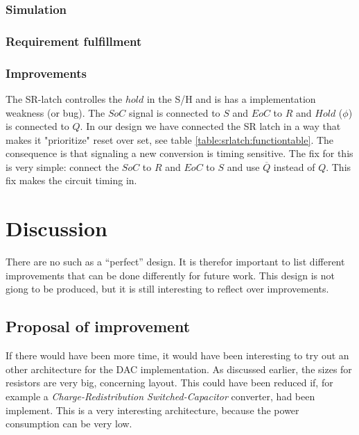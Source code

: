\documentclass[english, 12pt, a4paper]{ifimaster}
\begin{document}
% 


\subsection{Simulation}


\subsection{Requirement fulfillment}

\subsection{Improvements}
The SR-latch controlles the \(hold\) in the S/H and is has a implementation weakness (or bug). The \(SoC\) signal is connected to \(S\) and \(EoC\) to  \(R\) and \(Hold\) (\(\phi\)) is connected to \(Q\). 
In our design we have connected the SR latch in a way that makes it "prioritize" reset over set, see table \ref{table:srlatch:functiontable}.
The consequence is that signaling a new conversion is timing sensitive.
The fix for this is very simple: connect the \(SoC\) to \(R\) and \(EoC\) to \(S\) and use \(\overline{Q}\) instead of \(Q\). This fix makes the circuit timing in.


\chapter{Discussion}
There are no such as a ``perfect'' design. It is therefor important to list different improvements that
can be done differently for future work. This design is not giong to be produced, but it is still 
interesting to reflect over improvements. 

\section{Proposal of improvement}
If there would have been more time, it would have been interesting to try out an other architecture
for the DAC implementation. As discussed earlier, the sizes for resistors are very big, concerning
layout. This could have been reduced if, for example a \textit{Charge-Redistribution Switched-Capacitor} 
converter, had been implement. This is a very interesting architecture, because the power consumption
can be very low. 
\end{document}
